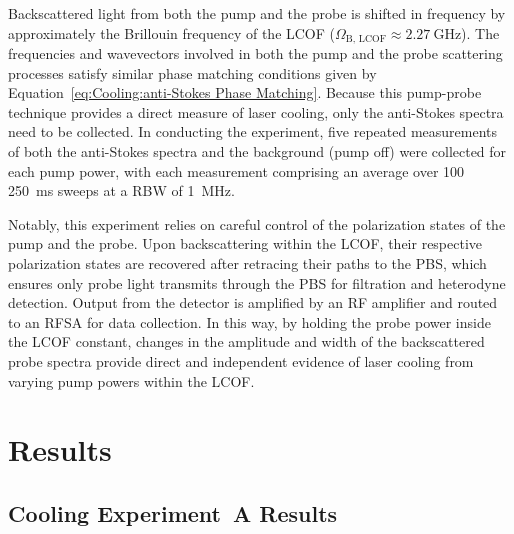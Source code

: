 Backscattered light from both the pump and the probe is shifted in frequency by approximately the Brillouin frequency of the \ac{LCOF} (\(\Omega_{\mathrm{B,\,LCOF}} \approx \SI{2.27}{\giga\hertz}\)). The frequencies and wavevectors involved in both the pump and the probe scattering processes satisfy similar phase matching conditions given by Equation~\ref{eq:Cooling:anti-Stokes Phase Matching}. Because this pump-probe technique provides a direct measure of laser cooling, only the anti-Stokes spectra need to be collected. In conducting the experiment, five repeated measurements of both the anti-Stokes spectra and the background (pump off) were collected for each pump power, with each measurement comprising an average over 100 \SI{250}{\milli\second} sweeps at a \ac{RBW} of \SI{1}{\mega\hertz}.

Notably, this experiment relies on careful control of the polarization states of the pump and the probe. Upon backscattering within the \ac{LCOF}, their respective polarization states are recovered after retracing their paths to the \ac{PBS}, which ensures only probe light transmits through the \ac{PBS} for filtration and heterodyne detection. Output from the detector is amplified by an \ac{RF} amplifier and routed to an \ac{RFSA} for data collection. In this way, by holding the probe power inside the \ac{LCOF} constant, changes in the amplitude and width of the backscattered probe spectra provide direct and independent evidence of laser cooling from varying pump powers within the \ac{LCOF}.


\section{Results}
\label{Cooling:sec:Results}


\subsection{Cooling Experiment~A Results}
\label{Cooling:subsec:ExperimentAResults}


